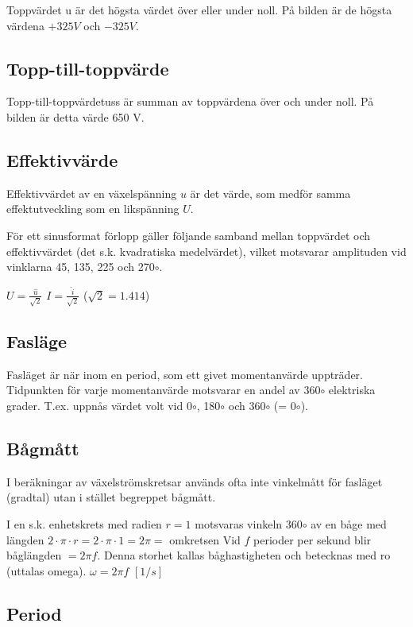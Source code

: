 Toppvärdet u är det högsta värdet över eller under noll. På bilden är de högsta
värdena \(+325 V\) och \(-325 V\).

\subsection{Topp-till-toppvärde}

Topp-till-toppvärdetuss är summan av toppvärdena över och under noll. På bilden är
detta värde 650 V.

\subsection{Effektivvärde}

Effektivvärdet av en växelspänning \(u\) är det värde, som medför samma effektutveckling
som en likspänning \(U\).

För ett sinusformat förlopp gäller följande samband mellan toppvärdet och effektivvärdet
(det s.k. kvadratiska medelvärdet), vilket motsvarar amplituden vid vinklarna 45,
135, 225 och 270\(\circ\).

\(U=\frac{\hat{u}}{\sqrt{2}}\) \(I=\frac{\hat{i}}{\sqrt{2}}\) (\(\sqrt{2} = 1.414\))

\subsection{Fasläge}

Fasläget är när inom en period, som ett givet momentanvärde uppträder. Tidpunkten för
varje momentanvärde motsvarar en andel av 360\(\circ\) elektriska grader. T.ex. uppnås
värdet volt vid 0\(\circ\), 180\(\circ\) och 360\(\circ\) (= 0\(\circ\)).

\subsection{Bågmått}

I beräkningar av växelströmskretsar används ofta inte vinkelmått för fasläget (gradtal)
utan i stället begreppet bågmått.

I en s.k. enhetskrets med radien \(r = 1\) motsvaras vinkeln 360\(\circ\) av en båge med
längden \(2 \cdot \pi \cdot r= 2 \cdot \pi \cdot 1 = 2 \pi =\) omkretsen
Vid \(f\) perioder per sekund blir båglängden \(= 2\pi f\). Denna storhet kallas båghastigheten
och betecknas med ro (uttalas omega).
\(\omega= 2\pi f\) \([1/s]\)

\subsection{Period}

